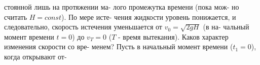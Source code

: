 \begin{minipage}[t]{0.44\textwidth}
        стоянной лишь на протяжении ма-\linebreak
        лого промежутка времени (пока мож-\linebreak
        но считать $H=const$). По мере исте-\linebreak
        чения жидкости уровень понижается,\linebreak
        и следовательно, скорость истечения\linebreak
        уменьшается от $v_0=\sqrt{2gH}$ (в на-\linebreak
        чальный момент времени $t=0$) до\linebreak
        $v_T=0$ ($T$ - время вытекания). Каков\linebreak
        характер изменения скорости со вре-\linebreak
        менем? Пусть в начальный момент\linebreak
        времени ($t_1=0$), когда открывают от-\linebreak
\end{minipage}
